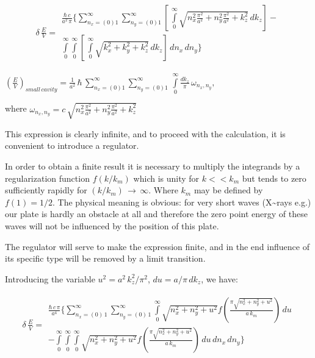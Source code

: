 \documentclass[11pt]{article}
\begin{document}
    \[\begin{array}{lr}
\delta\,\frac{E}{V} =
\begin{array}{c}
\frac{\hbar\,c}{a^2\,\pi}\Bigg\{\sum\limits_{n_x=(0)1}^{\infty}\sum\limits_{n_y=(0)1}^{\infty}\left[\,\int\limits_{0}^{\infty}\sqrt{n_x^2\frac{\pi^2}{a^2}+n_y^2\frac{\pi^2}{a^2}+k_z^2}\,dk_z\right] - \\ \int\limits_{0}^{\infty}\int\limits_{0}^{\infty}\left[\,\int\limits_{0}^{\infty}\sqrt{k_x^2+k_y^2+k_z^2}\,dk_z\right]\,dn_x\,dn_y\Bigg\}
\end{array}\end{array}\]

    

    \({\left(\frac{E}{V}\right)_{small\,cavity} = \frac{1}{a^2}\,\hbar \, \sum\limits_{n_x=(0)1}^{\infty}\sum\limits_{n_y=(0)1}^{\infty}\,\int\limits_{0}^{\infty} {\frac {dk_{z}}{\pi}}\,\omega _{n_x,n_y},}\)

    where
\(\omega _{n_x,n_y} = c\,\sqrt{n_x^2\frac{\pi^2}{a^2}+n_y^2\frac{\pi^2}{a^2}+k_z^2}\)

    This expression is clearly infinite, and to proceed with the
calculation, it is convenient to introduce a regulator.

    In order to obtain a finite result it is necessary to multiply the
integrands by a regularization function \(f(k/k_m)\) which is unity for
\(k << k_m\) but tends to zero sufficiently rapidly for
\((k/k_m)\, \rightarrow\,\infty\). Where \(k_m\) may be defined by
\(f(1) = {1}/{2}\). The physical meaning is obvious: for very short
waves (X\textasciitilde{}rays e.g.) our plate is hardly an obstacle at
all and therefore the zero point energy of these waves will not be
influenced by the position of this plate.

    The regulator will serve to make the expression finite, and in the end
influence of its specific type will be removed by a limit transition.

    Introducing the variable \(u^2 = a^2\,k_z^2/\pi^2\),
\(du = a/\pi\,dk_z\), we have:

    \begin{equation}
\begin{array}{lr}
\delta\,\frac{E}{V} =
\begin{array}{c}
\frac{\hbar\,c\,\pi}{a^4}\Bigg\{
\sum\limits_{n_x=\left(0\right)\,1}^{\infty}
\sum\limits_{n_y=\left(0\right)\,1}^{\infty}
\int\limits_{0}^{\infty}
{\sqrt{n_x^2 + n_y^2 + u^2}}
f\left(\frac{\pi\sqrt{n_x^2 + n_y^2 + u^2}}{a\,k_m}\right)
\,d{u} \\
- \int\limits_{0}^{\infty}
\int\limits_{0}^{\infty}
\int\limits_{0}^{\infty}
{\sqrt{n_x^2 + n_y^2 + u^2}}
f\left(\frac{\pi\sqrt{n_x^2 + n_y^2 + u^2}}{a\,k_m}\right)
\,d{u}\,d{n_x}\,d{n_y}
\Bigg\}
\end{array}
\end{array}
\end{equation}
\end{document}

